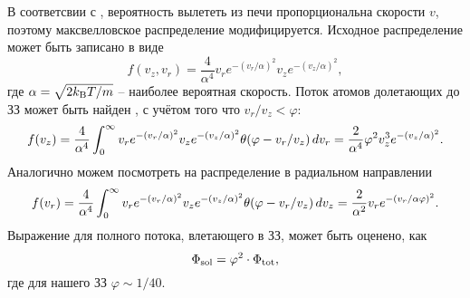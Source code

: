 В соответсвии с \cite{ramsey_molecular_1985}, вероятность вылететь из печи пропорциональна скорости $v$, поэтому максвелловское распределение модифицируется. Исходное распределение может быть записано в виде
\begin{equation}
	f(v_z, v_r) = \frac{4}{\alpha^4} v_r e^{-(v_r/\alpha)^2} v_z e^{-(v_z/\alpha)^2},
\end{equation}
где $\alpha = \sqrt{2 k_{\textnormal{B}} T/m}$ -- наиболее вероятная скорость. Поток атомов долетающих до ЗЗ может быть найден \cite{tiecke_high-flux_2009}, с учётом того что
$v_r / v_z < \varphi$:
\begin{equation}
	f(v_z) = \frac{4}{\alpha^4} \int_{0}^{\infty}  v_r e^{-(v_r/\alpha)^2} v_z e^{-(v_z/\alpha)^2} \theta(\varphi - v_r/v_z) \, d v_r = \frac{2}{\alpha^4} \varphi^2 v_z^3 e^{-(v_z/\alpha)^2}.
\end{equation}
Аналогично можем посмотреть на распределение в радиальном направлении
\begin{equation}
	f(v_r) = \frac{4}{\alpha^4} \int_{0}^{\infty}  v_r e^{-(v_r/\alpha)^2} v_z e^{-(v_z/\alpha)^2} \theta(\varphi - v_r/v_z) \, d v_z = \frac{2}{\alpha^2} v_r e^{-(v_r/\alpha \varphi)^2}.
\end{equation}
Выражение для полного потока, влетающего в ЗЗ, может быть оценено, как
\begin{equation}
	\Phi_{\textnormal{sol}} = \varphi^2 \cdot \Phi_{\textnormal{tot}},
	\label{phisol}
\end{equation}
где для нашего ЗЗ $\varphi \sim 1/40$.  


















